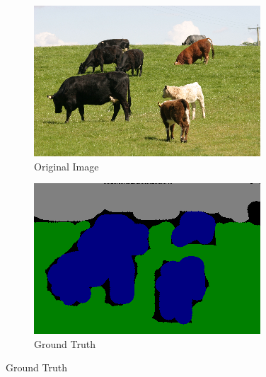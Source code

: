 \documentclass{article} %
\begin{document}
\begin{figure}[htb]
\centering
	\begin{subfigure}[t]{0.33\textwidth}
		\centering
		\includegraphics[width = \textwidth]{./img/1_11_s.png}
		\parbox{.95\textwidth}{\caption{Original Image \label{fig:orig_good}}}
			\end{subfigure}
	\begin{subfigure}[t]{0.33\textwidth}
		\centering
		\includegraphics[width = \textwidth]{./img/1_11_s_GT.png}
		\parbox{0.95\textwidth}{\caption{Ground Truth \label{fig:GT_good}}}
	\end{subfigure}


\end{figure}
\end{document}
